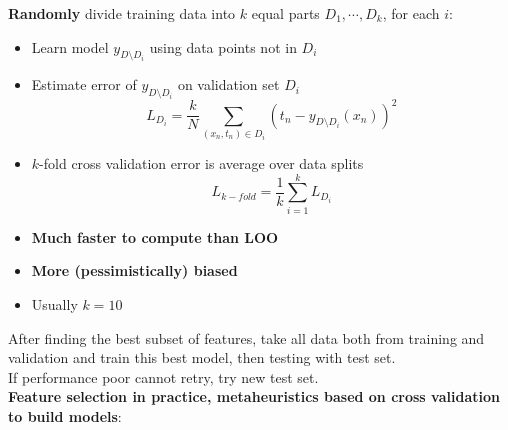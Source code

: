 \begin{itemize}
        \textbf{Randomly} divide training data into $k$ equal parts $D_1,\cdots,D_k$, for each $i$:
        \begin{itemize}
            \item Learn model $y_{D\setminus D_i}$ using data points not in $D_i$
            \item Estimate error of $y_{D\setminus D_i}$ on validation set $D_i$
            $$L_{D_i}=\frac{k}{N}\sum_{(x_n,t_n)\in D_i}(t_n-y_{D\setminus D_i}(x_n))^2$$
            \item $k$-fold cross validation error is average over data splits
            $$L_{k-fold}=\frac{1}{k}\sum_{i=1}^k L_{D_i}$$
            \item \textbf{Much faster to compute than LOO}
            \item \textbf{More (pessimistically) biased}
            \item Usually $k=10$
        \end{itemize}
    \end{itemize}
    After finding the best subset of features, take all data both from training and validation and train this best model, then testing with test set.\\
    If performance poor cannot retry, try new test set.\\
    \textbf{Feature selection in practice, metaheuristics based on cross validation to build models}:
